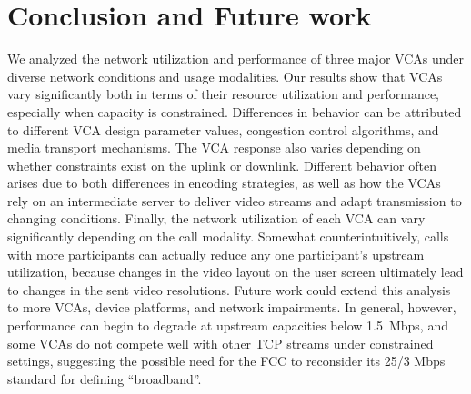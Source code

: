 \section{Conclusion and Future work}
\label{sec:conclusion}

We analyzed the network utilization and performance of three major VCAs under
diverse network conditions and usage modalities. Our results show that VCAs
vary significantly both in terms of their resource utilization and
performance, especially when capacity is constrained.  Differences in behavior
can be attributed to different VCA design parameter values, congestion control
algorithms, and media transport mechanisms. The VCA response also varies
depending on whether constraints exist on the uplink or downlink. Different
behavior often arises due to both differences in encoding strategies, as well
as how the VCAs rely on an intermediate server to deliver video streams and
adapt transmission to changing conditions. Finally, the network utilization of
each VCA can vary significantly depending on the call modality. Somewhat
counterintuitively, calls with more participants can actually reduce any one
participant's upstream utilization, because changes in the video layout on the
user screen ultimately lead to changes in the sent video resolutions. Future
work could extend this analysis to more VCAs, device platforms, and network
impairments. In general, however, performance can begin to degrade at upstream
capacities below 1.5~Mbps, and some VCAs do not compete well with other TCP
streams under constrained settings, suggesting the possible need for the FCC
to reconsider its 25/3 Mbps standard for defining ``broadband''.

